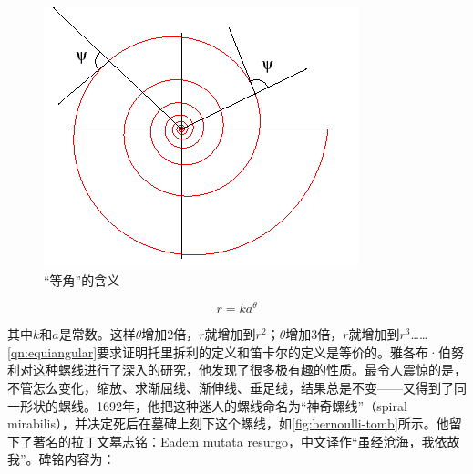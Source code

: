 \documentclass[b5paper]{ctexart}
\begin{document}
\begin{figure}[htbp]
 \centering
 \includegraphics[scale=0.4]{img/equiangular}
 \caption{“等角”的含义}
 \label{fig:equiangular}
\end{figure}

\[
r = ka^\theta
\]

其中$k$和$a$是常数。这样$\theta$增加2倍，$r$就增加到$r^2$；$\theta$增加3倍，$r$就增加到$r^3$……\cref{qn:equiangular}要求证明托里拆利的定义和笛卡尔的定义是等价的。雅各布·伯努利对这种螺线进行了深入的研究，他发现了很多极有趣的性质。最令人震惊的是，不管怎么变化，缩放、求渐屈线、渐伸线、垂足线，结果总是不变——又得到了同一形状的螺线。1692年，他把这种迷人的螺线命名为“神奇螺线”（spiral mirabilis），并决定死后在墓碑上刻下这个螺线，如\cref{fig:bernoulli-tomb}所示\cite{MacTour-Equiangular}。他留下了著名的拉丁文墓志铭：Eadem mutata resurgo，中文译作“虽经沧海，我依故我”\cite{Maor-2010}。碑铭内容为：
\end{document}
